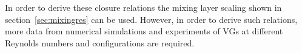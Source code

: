 In order to derive these closure relations the mixing layer scaling shown in section~\ref{sec:mixingres} can be used. However, in order to derive such relations, more data from numerical simulations and experiments of VGs at different Reynolds numbers and configurations are required. 


